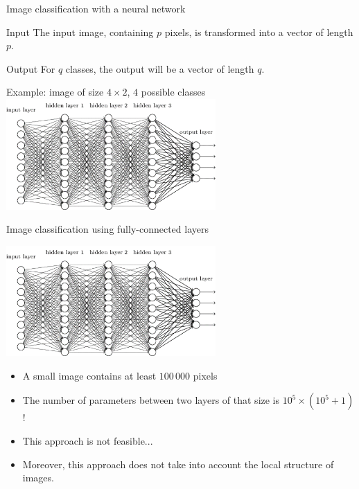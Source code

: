 \documentclass[handout,xcolor=pdftex,dvipsnames,table,mathserif]{beamer}
\begin{document}
\begin{frame}{Image classification with a neural network}

  \begin{block}{Input}
    The input image, containing $p$ pixels, is transformed into a vector of length $p$.
  \end{block}

  \begin{block}{Output}
    For $q$ classes, the output will be a vector of length $q$.
  \end{block}

\pause

  \begin{block}{Example: image of size $4 \times 2$, $4$ possible classes}
    \centering
      \includegraphics[width=0.6\textwidth]{network}
  \end{block}

\end{frame}


\begin{frame}{Image classification using fully-connected layers}

    \centering
      \includegraphics[width=0.6\textwidth]{network}

      \begin{itemize}[<+->]
      \item A small image contains at least $100\,000$ pixels
      \item The number of parameters between two layers of that size is $10^5 \times (10^5 + 1)$!
      \item This approach is not feasible...
      \item Moreover, this approach does not take into account the local structure of images.
      \end{itemize}

\end{frame}
\end{document}
